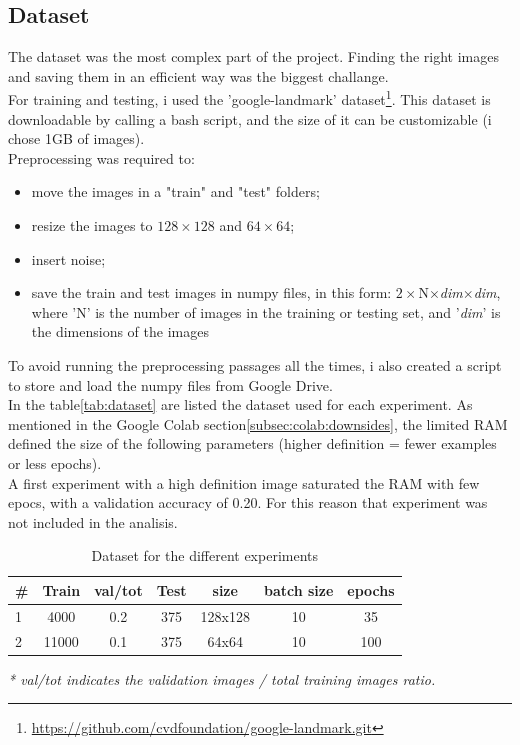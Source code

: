 \documentclass[twocolumn,showpacs,%
  nofootinbib,aps,superscriptaddress,%
  eqsecnum,prd,notitlepage,showkeys,10pt]{revtex4-1}
\begin{document}
\subsection{Dataset}
\label{subsec:dataset}
The dataset was the most complex part of the project. Finding the right images and saving them in an efficient way was the biggest challange.\\
For training and testing, i used the 'google-landmark' dataset\footnote{\url{https://github.com/cvdfoundation/google-landmark.git}}. This dataset is downloadable by calling a bash script, and the size of it can be customizable (i chose 1GB of images).\\
Preprocessing was required to:
\begin{itemize}
    \item move the images in a "train" and "test" folders;
    \item resize the images to $128\times128$ and $64\times64$;
    \item insert noise;
    \item save the train and test images in numpy files, in this form: $2\times$N$\times$\textit{dim}$\times$\textit{dim}, where 'N' is the number of images in the training or testing set, and '\textit{dim}' is the dimensions of the images 
\end{itemize}
To avoid running the preprocessing passages all the times, i also created a script to store and load the numpy files from Google Drive.\\
In the table\ref{tab:dataset} are listed the dataset used for each experiment. As mentioned in the Google Colab section\ref{subsec:colab:downsides}, the limited RAM defined the size of the following parameters (higher definition = fewer examples or less epochs).\\
A first experiment with a high definition image saturated the RAM with few epocs, with a validation accuracy of 0.20. For this reason that experiment was not included in the analisis.
\begin{table}[H] \label{tab:dataset}
    \centering
    \begin{tabular}{l|c|c|c|c|c|c}
    \#         & Train           & val/tot\* & Test       & size       & batch size & epochs \\\hline
    1          &  4000           & 0.2      &  375       &  128x128    & 10   &  35 \\\hline
    2          &  11000          & 0.1      &  375       &  64x64      & 10     &  100
    \end{tabular}
    \caption{\label{tab:widgets}Dataset for the different experiments}
    \end{table}
\textit{* val/tot indicates the validation images / total training images ratio.}\\
\end{document}
